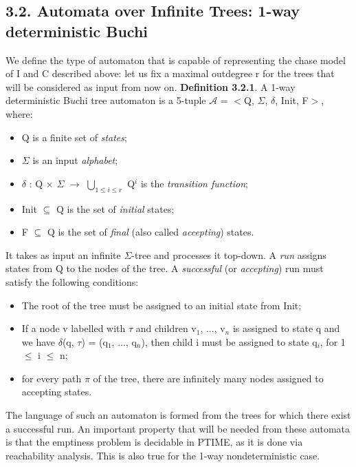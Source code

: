 \documentclass[11pt, a4paper, dvipsnames]{article}
\begin{document}
\subsection{3.2. Automata over Infinite Trees: 1-way deterministic Buchi}
We define the type of automaton that is capable of representing the chase model of I and C described above: let us fix a maximal outdegree r for the trees that will be considered as input from now on.\newline
\textbf{Definition 3.2.1}. A 1-way deterministic B$\ddot{u}$chi tree automaton is a 5-tuple \newline
$\mathcal{A}$ = $<$Q, $\Sigma$, $\delta$, Init, F$>$, where:
\begin{itemize}
	\item Q is a finite set of \textit{states};
	\item $\Sigma$ is an input \textit{alphabet};
	\item $\delta$ : Q $\times$ $\Sigma$ $\rightarrow$ $\bigcup_{1 \leq i \leq r}$ Q$^{i}$ is the \textit{transition function};
	\item Init $\subseteq$ Q is the set of \textit{initial} states;
	\item F $\subseteq$ Q is the set of \textit{final} (also called \textit{accepting}) states.
\end{itemize}
It takes as input an infinite $\Sigma$-tree and processes it top-down. A \textit{run} assigns states from Q to the nodes of the tree. A \textit{successful} (or \textit{accepting}) run must satisfy the following conditions:
\begin{itemize}
	\item The root of the tree must be assigned to an initial state from Init;
	\item If a node v labelled with $\tau$ and children v$_{1}$, ..., v$_{n}$ is assigned to state q and we have $\delta$(q, $\tau$) = (q$_{1}$, ..., q$_{n}$), then child i must be assigned to state q$_{i}$, for 1 $\leq$ i $\leq$ n;
	\item for every path $\pi$ of the tree, there are infinitely many nodes assigned to accepting states. 
\end{itemize}
The language of such an automaton is formed from the trees for which there exist a successful run. An important property that will be needed from these automata is that the emptiness problem is decidable in PTIME, as it is done via reachability analysis. This is also true for the 1-way nondeterministic case.
\end{document}
